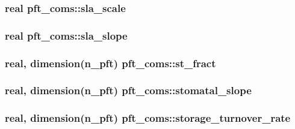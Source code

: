 \subsubsection[{sla\+\_\+scale}]{\setlength{\rightskip}{0pt plus 5cm}real pft\+\_\+coms\+::sla\+\_\+scale}\label{namespacepft__coms_a1ba9e47e49347dca3d82a5d2a694136d}
\hypertarget{namespacepft__coms_abac97f719f7239eac0e2ad92dc9a8bef}{}
\subsubsection[{sla\+\_\+slope}]{\setlength{\rightskip}{0pt plus 5cm}real pft\+\_\+coms\+::sla\+\_\+slope}\label{namespacepft__coms_abac97f719f7239eac0e2ad92dc9a8bef}
\hypertarget{namespacepft__coms_a24d6f9401bfd2a1127dbc4b957a6d94e}{}
\subsubsection[{st\+\_\+fract}]{\setlength{\rightskip}{0pt plus 5cm}real, dimension(n\+\_\+pft) pft\+\_\+coms\+::st\+\_\+fract}\label{namespacepft__coms_a24d6f9401bfd2a1127dbc4b957a6d94e}
\hypertarget{namespacepft__coms_a36d072c9dc75fed2a29770bb892c0c8d}{}
\subsubsection[{stomatal\+\_\+slope}]{\setlength{\rightskip}{0pt plus 5cm}real, dimension(n\+\_\+pft) pft\+\_\+coms\+::stomatal\+\_\+slope}\label{namespacepft__coms_a36d072c9dc75fed2a29770bb892c0c8d}
\hypertarget{namespacepft__coms_ac6e0048b175e1bdd410e60c25eddd828}{}
\subsubsection[{storage\+\_\+turnover\+\_\+rate}]{\setlength{\rightskip}{0pt plus 5cm}real, dimension(n\+\_\+pft) pft\+\_\+coms\+::storage\+\_\+turnover\+\_\+rate}\label{namespacepft__coms_ac6e0048b175e1bdd410e60c25eddd828}
\hypertarget{namespacepft__coms_a5cfdb0129f160897b6cc37536a67cfc5}{}
